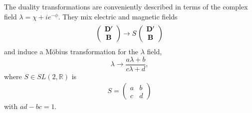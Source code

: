 \documentclass[a4paper,12pt]{article}
\begin{document}
\noindent

The duality transformations are conveniently described in terms of the 
complex field $\lambda=\chi+ie^{-\phi}$. They mix electric and magnetic fields 
\cite{3}
\begin{eqnarray}
\left(\begin{array}{c}
{{\bf D}}^{\prime}\\
{\bf B}
\end{array}\right)
\rightarrow S
\left(\begin{array}{c}
{{\bf D}}^{\prime}\\
{\bf B}
\end{array}\right)
\label{d3}
\end{eqnarray}
and induce a M\"obius transformation for the $\lambda$ field,
\begin{equation}
\lambda\rightarrow\frac{a\lambda +b}{c\lambda+d},
\label{d4}
\end{equation}
where $S\in SL(2,\mathbb{R})$ is
\begin{eqnarray}
S=
\left(\begin{array}{cc}
a & b\\
c & d
\end{array}\right)
\label{d5}
\end{eqnarray}
with $ad-bc=1$.

\noindent
\end{document}
